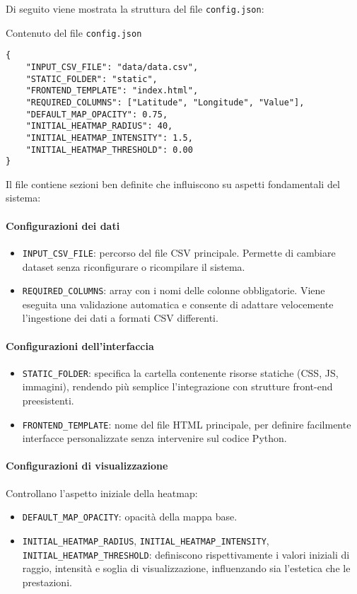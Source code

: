 Di seguito viene mostrata la struttura del file \texttt{config.json}:

\begin{listing}[H]
\caption{Contenuto del file \texttt{config.json}}
\label{lst:config_json} %
\begin{verbatim}
{
    "INPUT_CSV_FILE": "data/data.csv",
    "STATIC_FOLDER": "static",
    "FRONTEND_TEMPLATE": "index.html",
    "REQUIRED_COLUMNS": ["Latitude", "Longitude", "Value"],
    "DEFAULT_MAP_OPACITY": 0.75,
    "INITIAL_HEATMAP_RADIUS": 40,
    "INITIAL_HEATMAP_INTENSITY": 1.5,
    "INITIAL_HEATMAP_THRESHOLD": 0.00
}
\end{verbatim}
\end{listing}

Il file contiene sezioni ben definite che influiscono su aspetti fondamentali del sistema:

\paragraph{Configurazioni dei dati}  
\begin{itemize}
  \item \texttt{INPUT\_CSV\_FILE}: percorso del file CSV principale. Permette di cambiare dataset senza riconfigurare o ricompilare il sistema.
  \item \texttt{REQUIRED\_COLUMNS}: array con i nomi delle colonne obbligatorie. Viene eseguita una validazione automatica e consente di adattare velocemente l'ingestione dei dati a formati CSV differenti.
\end{itemize}

\paragraph{Configurazioni dell'interfaccia}  
\begin{itemize}
  \item \texttt{STATIC\_FOLDER}: specifica la cartella contenente risorse statiche (CSS, JS, immagini), rendendo più semplice l'integrazione con strutture front-end preesistenti.
  \item \texttt{FRONTEND\_TEMPLATE}: nome del file HTML principale, per definire facilmente interfacce personalizzate senza intervenire sul codice Python.
\end{itemize}

\paragraph{Configurazioni di visualizzazione}  
Controllano l'aspetto iniziale della heatmap:
\begin{itemize}
  \item \texttt{DEFAULT\_MAP\_OPACITY}: opacità della mappa base.
  \item \texttt{INITIAL\_HEATMAP\_RADIUS}, \texttt{INITIAL\_HEATMAP\_INTENSITY}, \texttt{INITIAL\_HEATMAP\_THRESHOLD}: definiscono rispettivamente i valori iniziali di raggio, intensità e soglia di visualizzazione, influenzando sia l'estetica che le prestazioni.
\end{itemize}
